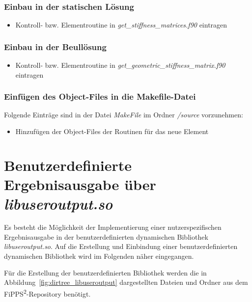 \documentclass[11pt,titlepage,listof=totoc,bibliography=totoc,twoside]{scrreprt}
\begin{document}
{{\subsection{Einbau in der statischen Lösung}

\begin{itemize}
\item Kontroll- bzw. Elementroutine in \emph{get\_stiffness\_matrices.f90} eintragen
\end{itemize}

\subsection{Einbau in der Beullösung}

\begin{itemize}
\item Kontroll- bzw. Elementroutine in \emph{get\_geometric\_stiffness\_matrix.f90} eintragen
\end{itemize}

\subsection{Einfügen des Object-Files in die Makefile-Datei}

Folgende Einträge sind in der Datei \emph{MakeFile} im Ordner \emph{/source} vorzunehmen:

\begin{itemize}
\item Hinzufügen der Object-Files der Routinen für das neue Element
\end{itemize}

\newpage

\chapter{Benutzerdefinierte Ergebnisausgabe über \emph{libuseroutput.so}}
\label{sec:libuseroutput}

Es besteht die Möglichkeit der Implementierung einer nutzerspezifischen Ergebnisausgabe in der benutzerdefinierten dynamischen Bibliothek \emph{libuseroutput.so}. Auf die Erstellung und Einbindung einer benutzerdefinierten dynamischen Bibliothek wird im Folgenden näher eingegangen.

Für die Erstellung der benutzerdefinierten Bibliothek werden die in Abbildung~\ref{fig:dirtree_libuseroutput} dargestellten Dateien und Ordner aus dem FiPPS\textsuperscript{2}-Repository benötigt.

}}
\end{document}
